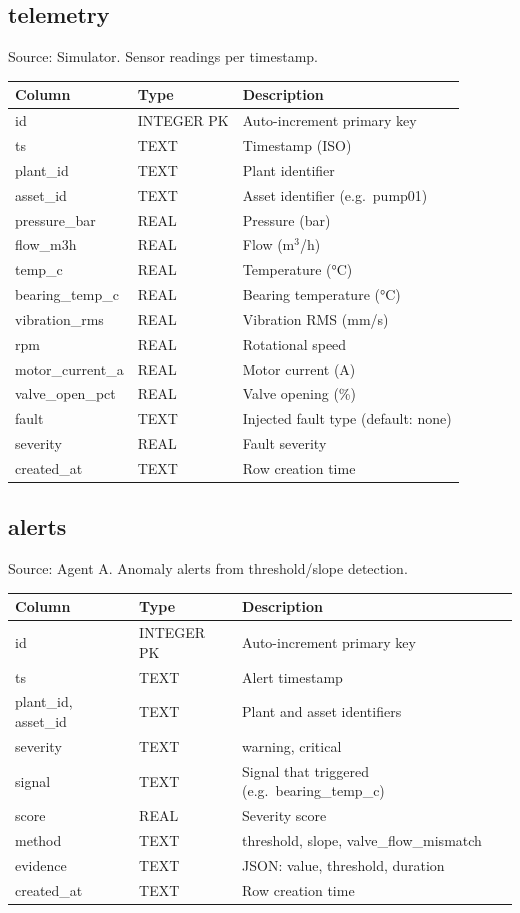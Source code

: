 \documentclass[12pt,letterpaper]{report}
\begin{document}
\subsection*{telemetry}
Source: Simulator. Sensor readings per timestamp.

\begin{tabular}{@{}llp{5.5cm}@{}}
\toprule
\textbf{Column} & \textbf{Type} & \textbf{Description} \\
\midrule
id & INTEGER PK & Auto-increment primary key \\
ts & TEXT & Timestamp (ISO) \\
plant\_id & TEXT & Plant identifier \\
asset\_id & TEXT & Asset identifier (e.g.\ pump01) \\
pressure\_bar & REAL & Pressure (bar) \\
flow\_m3h & REAL & Flow (m$^3$/h) \\
temp\_c & REAL & Temperature (°C) \\
bearing\_temp\_c & REAL & Bearing temperature (°C) \\
vibration\_rms & REAL & Vibration RMS (mm/s) \\
rpm & REAL & Rotational speed \\
motor\_current\_a & REAL & Motor current (A) \\
valve\_open\_pct & REAL & Valve opening (\%) \\
fault & TEXT & Injected fault type (default: none) \\
severity & REAL & Fault severity \\
created\_at & TEXT & Row creation time \\
\bottomrule
\end{tabular}

\subsection*{alerts}
Source: Agent A. Anomaly alerts from threshold/slope detection.

\begin{tabular}{@{}llp{5.5cm}@{}}
\toprule
\textbf{Column} & \textbf{Type} & \textbf{Description} \\
\midrule
id & INTEGER PK & Auto-increment primary key \\
ts & TEXT & Alert timestamp \\
plant\_id, asset\_id & TEXT & Plant and asset identifiers \\
severity & TEXT & warning, critical \\
signal & TEXT & Signal that triggered (e.g.\ bearing\_temp\_c) \\
score & REAL & Severity score \\
method & TEXT & threshold, slope, valve\_flow\_mismatch \\
evidence & TEXT & JSON: value, threshold, duration \\
created\_at & TEXT & Row creation time \\
\bottomrule
\end{tabular}
\end{document}
